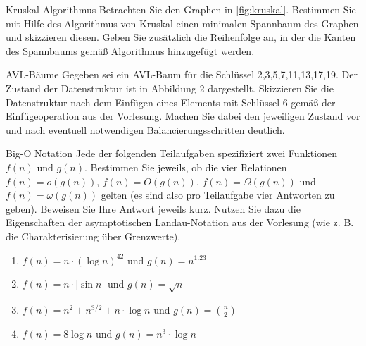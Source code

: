 \documentclass{article}
\begin{document}
\begin{exercise}{Kruskal-Algorithmus}
  Betrachten Sie den Graphen in \ref{fig:kruskal}. Bestimmen Sie mit Hilfe des Algorithmus von Kruskal einen minimalen Spannbaum des Graphen und skizzieren diesen. Geben Sie zusätzlich die Reihenfolge an, in der die Kanten des Spannbaums gemäß Algorithmus hinzugefügt werden.
  

  \begin{solution}

  \end{solution}
\end{exercise}

\begin{exercise}{AVL-Bäume}
  Gegeben sei ein AVL-Baum für die Schlüssel {2,3,5,7,11,13,17,19}. Der Zustand der Datenstruktur ist in Abbildung 2 dargestellt. Skizzieren Sie die Datenstruktur nach dem Einfügen eines Elements mit Schlüssel 6 gemäß der Einfügeoperation aus der Vorlesung. Machen Sie dabei den jeweiligen Zustand vor und nach eventuell notwendigen Balancierungsschritten deutlich.
  

  \begin{solution}

  \end{solution}
\end{exercise}

\begin{exercise}{Big-O Notation}
  Jede der folgenden Teilaufgaben spezifiziert zwei Funktionen $f(n)$ und $g(n)$. Bestimmen Sie jeweils, ob die vier Relationen $f(n) = o(g(n))$, $f(n) = O(g(n))$, $f(n) = \Omega(g(n))$ und $f(n) = \omega(g(n))$ gelten (es sind also pro Teilaufgabe vier Antworten zu geben). Beweisen Sie Ihre Antwort jeweils kurz. Nutzen Sie dazu die Eigenschaften der asymptotischen Landau-Notation aus der Vorlesung (wie z. B. die Charakterisierung über Grenzwerte).
  \begin{enumerate}
    \item $f(n) = n \cdot (\log n)^{42}$ und $g(n) = n^{1.23}$
    \item $f(n) = n \cdot |\sin n|$ und $g(n) = \sqrt{n}$
    \item $f(n) = n^2 + n^{3/2} + n \cdot \log n$ und $g(n) = \binom{n}{2}$
    \item $f(n) = 8 \log n$ und $g(n) = n^3 \cdot \log n$
  \end{enumerate}

  \begin{solution}

  \end{solution}
\end{exercise}
\end{document}
